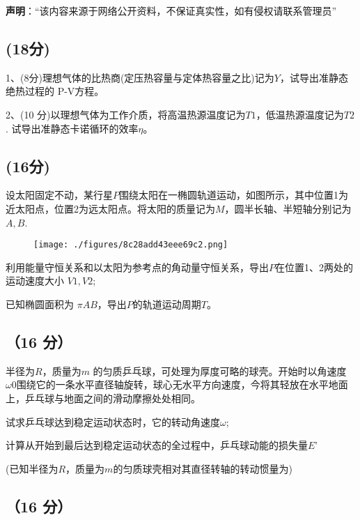 
\textbf{声明}：“该内容来源于网络公开资料，不保证真实性，如有侵权请联系管理员”

\subsection{(18分)}
1、(8分)理想气体的比热商(定压热容量与定体热容量之比)记为$Y$，试导出准静态绝热过程的 P-V方程。

2、(10 分)以理想气体为工作介质，将高温热源温度记为$T1$，低温热源温度记为$T2$.
试导出准静态卡诺循环的效率$\eta$。
\subsection{(16分)}
设太阳固定不动，某行星$P$围绕太阳在一椭圆轨道运动，如图所示，其中位置1为近太阳点，位置2为远太阳点。将太阳的质量记为$M$，圆半长轴、半短轴分别记为$A,B$.
\begin{figure}[ht]
\centering
\texttt{[image: ./figures/8c28add43eee69c2.png]}
\caption{} \label{fig_PKU200_1}
\end{figure}
利用能量守恒关系和以太阳为参考点的角动量守恒关系，导出$P$在位置1、2两处的运动速度大小 $V1,V2$;

已知椭圆面积为 $\pi AB$，导出$P$的轨道运动周期$T$。
\subsection{（16 分）}
半径为$R$，质量为$m$ 的匀质乒乓球，可处理为厚度可略的球壳。开始时以角速度$\omega0$围绕它的一条水平直径轴旋转，球心无水平方向速度，今将其轻放在水平地面上，乒乓球与地面之间的滑动摩擦处处相同。

试求乒乓球达到稳定运动状态时，它的转动角速度$\omega$;

计算从开始到最后达到稳定运动状态的全过程中，乒乓球动能的损失量$E$'

(已知半径为$R$，质量为$m$的匀质球壳相对其直径转轴的转动惯量为)
\subsection{（16 分）}